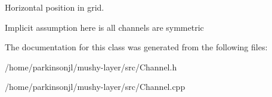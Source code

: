Horizontal position in grid. 

Implicit assumption here is all channels are symmetric 

The documentation for this class was generated from the following files\-:\begin{DoxyCompactItemize}
\item 
/home/parkinsonjl/mushy-\/layer/src/Channel.\-h\item 
/home/parkinsonjl/mushy-\/layer/src/Channel.\-cpp\end{DoxyCompactItemize}
